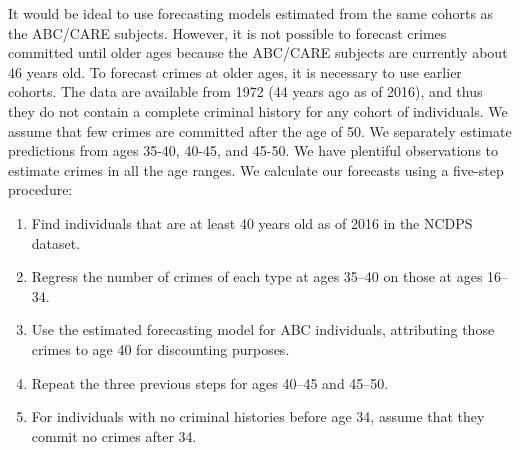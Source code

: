 It would be ideal to use forecasting models estimated from the same cohorts as the ABC/CARE subjects. However, it is not possible to forecast crimes committed until older ages because the ABC/CARE subjects are currently about 46 years old. To forecast crimes at older ages, it is necessary to use earlier cohorts. The data are available from 1972 (44 years ago as of 2016), and thus they do not contain a complete criminal history for any cohort of individuals.
We assume that few crimes are committed after the age of 50. 
 We separately estimate predictions from ages 35-40, 40-45, and 45-50. We have plentiful observations to estimate crimes in all the age ranges. %
We calculate our forecasts using a five-step procedure:
\begin{enumerate}
\item Find individuals that are at least 40 years old as of 2016 in the NCDPS dataset.
\item Regress the number of crimes of each type at ages 35--40 on those at ages 16--34.
\item Use the estimated forecasting model for ABC individuals, attributing those crimes to age 40 for discounting purposes.
\item Repeat the three previous steps for ages 40--45 and 45--50. %
\item For individuals with no criminal histories before age 34, assume that they commit no crimes after 34.
\end{enumerate}

